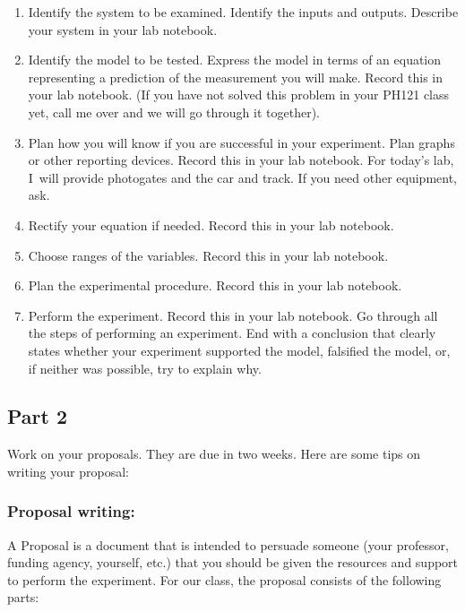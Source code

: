 \documentclass[twoside,11pt,ShortChapTitles]{BYUTextbook}
\begin{document}
\begin{enumerate}
\item Identify the system to be examined. Identify the inputs and outputs.
Describe your system in your lab notebook.

\item Identify the model to be tested. Express the model in terms of an
equation representing a prediction of the measurement you will make. Record
this in your lab notebook. (If you have not solved this problem in your
PH121 class yet, call me over and we will go through it together).

\item Plan how you will know if you are successful in your experiment. Plan
graphs or other reporting devices. Record this in your lab notebook. For
today's lab, I\ will provide photogates and the car and track. If you need
other equipment, ask.

\item Rectify your equation if needed. Record this in your lab notebook.

\item Choose ranges of the variables. Record this in your lab notebook.

\item Plan the experimental procedure. Record this in your lab notebook.

\item Perform the experiment. Record this in your lab notebook. Go through
all the steps of performing an experiment. End with a conclusion that
clearly states whether your experiment supported the model, falsified the
model, or, if neither was possible, try to explain why.
\end{enumerate}

\subsection{Part 2}

Work on your proposals. They are due in two weeks. Here are some tips on
writing your proposal:

\subsubsection{Proposal writing:}

A Proposal is a document that is intended to persuade someone (your
professor, funding agency, yourself, etc.) that you should be given the
resources and support to perform the experiment. For our class, the proposal
consists of the following parts:
\end{document}
